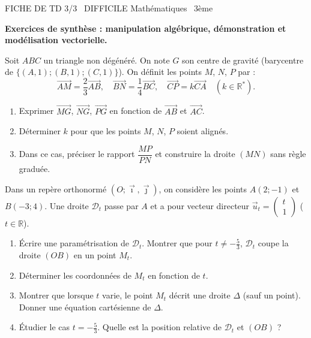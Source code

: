 \documentclass[11pt]{article}
\begin{document}
\begin{tcolorbox}[enhanced,colback=popink,colframe=popink,arc=10pt,boxrule=0pt,left=12pt,right=12pt,top=9pt,bottom=9pt]
{\color{white}\popxbold\small FICHE DE TD 3/3 \textbullet\ DIFFICILE \hfill Mathématiques \textbullet\ 3ème\par}
\end{tcolorbox}
\vspace{4pt}
\textbf{Exercices de synthèse : manipulation algébrique, démonstration et modélisation vectorielle.}

\begin{exercice}
Soit $ABC$ un triangle non dégénéré. On note $G$ son centre de gravité (barycentre de $\{(A,1);(B,1);(C,1)\}$).
On définit les points $M$, $N$, $P$ par :
\[
\overrightarrow{AM} = \frac{2}{3}\overrightarrow{AB},\quad
\overrightarrow{BN} = \frac{1}{4}\overrightarrow{BC},\quad
\overrightarrow{CP} = k\overrightarrow{CA}\quad (k\in\mathbb{R}^*).
\]
\begin{enumerate}
    \item Exprimer $\overrightarrow{MG}$, $\overrightarrow{NG}$, $\overrightarrow{PG}$ en fonction de $\overrightarrow{AB}$ et $\overrightarrow{AC}$.
    \item Déterminer $k$ pour que les points $M$, $N$, $P$ soient alignés.
    \item Dans ce cas, préciser le rapport $\dfrac{MP}{PN}$ et construire la droite $(MN)$ sans règle graduée.
\end{enumerate}
\end{exercice}

\begin{exercice}
Dans un repère orthonormé $(O;\vec{\imath},\vec{\jmath})$, on considère les points $A(2;-1)$ et $B(-3;4)$.
Une droite $\mathcal{D}_t$ passe par $A$ et a pour vecteur directeur $\vec{u}_t = \begin{pmatrix} t \\ 1 \end{pmatrix}$ ($t\in\mathbb{R}$).
\begin{enumerate}
    \item Écrire une paramétrisation de $\mathcal{D}_t$. Montrer que pour $t\neq -\frac{5}{3}$, $\mathcal{D}_t$ coupe la droite $(OB)$ en un point $M_t$.
    \item Déterminer les coordonnées de $M_t$ en fonction de $t$.
    \item Montrer que lorsque $t$ varie, le point $M_t$ décrit une droite $\Delta$ (sauf un point). Donner une équation cartésienne de $\Delta$.
    \item Étudier le cas $t = -\frac{5}{3}$. Quelle est la position relative de $\mathcal{D}_t$ et $(OB)$ ?
\end{enumerate}
\end{exercice}
\end{document}
